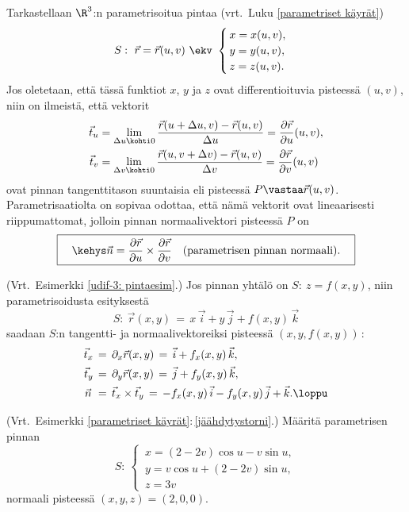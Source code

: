 Tarkastellaan $\R^3$:n parametrisoitua pintaa (vrt.\ Luku \ref{parametriset käyrät})
\[
S:\ \vec r=\vec r(u,v)\ \ekv\ 
                        \begin{cases} \,x=x(u,v),\\ \,y=y(u,v), \\ \,z=z(u,v). \end{cases}
\]
Jos oletetaan, että tässä funktiot $x$, $y$ ja $z$ ovat differentioituvia pisteessä $(u,v)$,
niin on ilmeistä, että vektorit
\begin{align*}
\vec t_u &= \lim_{\Delta u\kohti 0} \frac{\vec r(u+\Delta u,v)-\vec r(u,v)}{\Delta u}
          =\frac{\partial\vec r}{\partial u}(u,v), \\
\vec t_v &= \lim_{\Delta v\kohti 0} \frac{\vec r(u,v+\Delta v)-\vec r(u,v)}{\Delta v}
          =\frac{\partial\vec r}{\partial v}(u,v)
\end{align*}
%
ovat pinnan tangenttitason suuntaisia eli  pisteessä 
$P\vastaa\vec r(u,v)$. Parametrisaatiolta on sopivaa odottaa, että nämä vektorit
ovat lineaarisesti riippumattomat, jolloin pinnan normaalivektori pisteessä $P$ on
\[
\boxed{\quad\kehys 
  \vec n=\frac{\partial \vec r}{\partial u}\times\frac{\partial \vec r}{\partial v} \quad
         \text{(parametrisen pinnan normaali)}. \quad}
\]
\begin{Exa} (Vrt.\ Esimerkki \ref{udif-3: pintaesim}.) Jos pinnan yhtälö on $S:\ z=f(x,y)$,
niin parametrisoidusta esityksestä
\[ 
S:\ \vec r(x,y)\,=\,x\,\vec i+y\,\vec j+f(x,y)\,\vec k
\]
saadaan $S$:n tangentti- ja normaalivektoreiksi pisteessä $(x,y,f(x,y))\,$:
\begin{align*}
\vec t_x\,&=\,\partial_x\vec r(x,y)\,=\,\vec i+f_x(x,y)\,\vec k, \\
\vec t_y\,&=\,\partial_y\vec r(x,y)\,=\,\vec j+f_y(x,y)\,\vec k, \\
\vec n\   &=\,\vec t_x \times \vec t_y\,=\,-f_x(x,y)\,\vec i -f_y(x,y)\,\vec j+\vec k. \loppu
\end{align*}
\end{Exa}
\begin{Exa} (Vrt.\ Esimerkki \ref{parametriset käyrät}:\,\ref{jäähdytystorni}.) Määritä
parametrisen pinnan
\[
S:\ \begin{cases} \,x=(2-2v)\cos u-v\sin u, \\ \,y=v\cos u+(2-2v)\sin u, \\ \,z=3v \end{cases}
\]
normaali pisteessä $(x,y,z)=(2,0,0)$.
\end{Exa}
